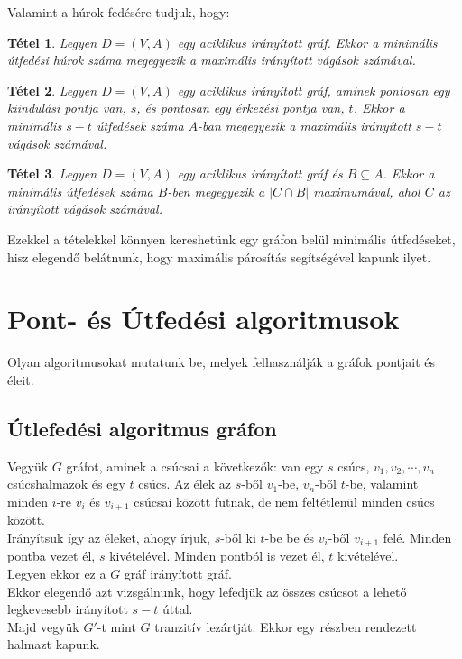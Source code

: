 \documentclass[12pt]{article}
\newtheorem{tetel}{Tétel}[section]
\begin{document}
Valamint a húrok fedésére tudjuk, hogy:

\begin{tetel}
Legyen $D = (V,A)$ egy aciklikus irányított gráf. Ekkor a minimális útfedési húrok száma megegyezik a maximális irányított vágások számával. ~\cite{bomze1999maximum}
\end{tetel}

\begin{tetel}
Legyen $D = (V,A)$ egy aciklikus irányított gráf, aminek pontosan egy kiindulási pontja van, $s$, és pontosan egy érkezési pontja van, $t$. Ekkor a minimális $s - t$ útfedések száma $A$-ban megegyezik a maximális irányított $s - t$ vágások számával. ~\cite{bomze1999maximum}
\end{tetel}

\begin{tetel}
Legyen $D = (V,A)$ egy aciklikus irányított gráf és $B \subseteq A$. Ekkor a minimális útfedések száma $B$-ben megegyezik a $|C \cap B|$ maximumával, ahol $C$ az irányított vágások számával. ~\cite{bomze1999maximum}
\end{tetel}

Ezekkel a tételekkel könnyen kereshetünk egy gráfon belül minimális útfedéseket, hisz elegendő belátnunk, hogy maximális párosítás segítségével kapunk ilyet.

\section{Pont- és Útfedési algoritmusok}

Olyan algoritmusokat mutatunk be, melyek felhasználják a gráfok pontjait és éleit.\\

\subsection{Útlefedési algoritmus gráfon}

Vegyük $G$ gráfot, aminek a csúcsai a következők:
van egy $s$ csúcs, $v_1, v_2, \cdots, v_n$ csúcshalmazok és egy $t$ csúcs.
Az élek az $s$-ből $v_1$-be, $v_n$-ből $t$-be, valamint minden $i$-re $v_i$ és $v_{i+1}$ csúcsai között futnak, de nem feltétlenül minden csúcs között.\\
Irányítsuk így az éleket, ahogy írjuk, $s$-ből ki $t$-be be és $v_i$-ből $v_{i+1}$ felé. Minden pontba vezet él, $s$ kivételével. Minden pontból is vezet él, $t$ kivételével.\\
Legyen ekkor ez a $G$ gráf irányított gráf.\\
Ekkor elegendő azt vizsgálnunk, hogy lefedjük az összes csúcsot a lehető legkevesebb irányított $s-t$ úttal.\\
Majd vegyük $G'$-t mint $G$ tranzitív lezártját. Ekkor egy részben rendezett halmazt kapunk.\\
\end{document}
